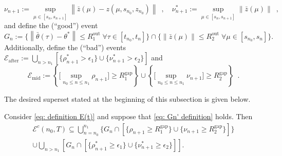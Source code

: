 \documentclass[usenames,dvipsnames,final,12pt]{colt2018} %
\newcommand{\et}{\epsilon_1}
\newcommand{\etg}{R_1^{\textrm{gap}}}
\newcommand{\Rto}{R_1^\textrm{out}}
\newcommand{\thS}{\theta^*}
\newcommand{\rt}{\rho}
\newcommand{\rtS}{\rho^{*}}
\newcommand{\bart}{\bar{\theta}}
\newcommand{\ez}{\epsilon_2}
\newcommand{\ezg}{R_2^{\textrm{gap}}}
\newcommand{\Rzo}{R_2^{\textrm{out}}}
\newcommand{\rz}{\nu}
\newcommand{\rzS}{\nu^{*}}
\newcommand{\barz}{\bar{z}}
\newcommand{\zSol}[1]{z(#1, \sI{n_0}, z_{n_0})}
\newcommand{\aftE}{\text{after}}
\newcommand{\midE}{\text{mid}}
\newcommand{\tI}[1]{t_{#1}}
\newcommand{\sI}[1]{s_{#1}}
\newcommand{\cE}{\mathcal{E}}
\newcommand{\norm}[1]{\left\lVert#1\right\rVert}
\newcommand{\gal}[1]{#1}
\newcommand{\gugan}[1]{#1}
\begin{document}
\begin{equation}
%
\label{defn:rhoz}
\rz_{n + 1} :=  \sup\limits_{\mu \in [\sI{n}, \sI{n + 1}]} \norm{\barz(\mu) - \zSol{\mu}}\enspace, \quad
%
\rzS_{n + 1} := \sup\limits_{\mu \in [\sI{n}, \sI{n + 1}]} \norm{\barz(\mu)}  \enspace,
\end{equation}
%
and define the (``good'') event
%
\begin{equation}
\label{defn:Gn}
G_n := \{ \norm{\bart(\tau) - \thS} \leq \Rto \; \forall \tau \in [\gal{\tI{n_0}}, \tI{n}]\}  \cap \{\norm{\barz(\mu)} \leq \Rzo \; \forall \mu \in [ \gal{\sI{n_0}}, \sI{n}]\}.
\end{equation}
%
Additionally, define the (``bad'') events $\cE_{\aftE} := \bigcup_{n > n_1}\left[ \{\rtS_{n + 1} > \et\} \cup \{\rzS_{n + 1} > \ez\}\right]$ and
%
\begin{equation*}
	\cE_{\midE}  := \left\{\Big[\sup_{\gal{n_0} \leq n \leq n_1} \rt_{n + 1}\Big] \geq \etg \right\}
	\cup \left\{\Big[\sup_{\gal{n_0} \leq n \leq n_1} \rz_{n + 1}\Big] \geq \ezg \right\} \enspace.
\end{equation*}


\gal{The} desired superset stated at the beginning of this subsection is given below.

\begin{lemma} \label{lem:IntEv}
	\gal{Consider \eqref{eq: definition E(t)} and suppose that \eqref{eq: Gn' definition} holds. Then}
	\gal{\begin{align*}
			\cE^c(n_0, T) \subseteq
			\bigcup_{n = n_0}^{n_1} \{ \! G_n \cap \left[ \{\rt_{n + 1} \geq \etg\} \! \cup \! \{\rz_{n + 1} \geq \ezg\}\right]\} \\ \cup
			\bigcup_{n > n_1} \left[ G_n \cap  \left[ \{\rtS_{n + 1} \geq \et\} \cup \{\rzS_{n + 1} \geq \ez\}\right]\right].
		\end{align*}
	}
\end{lemma}

\end{document}
